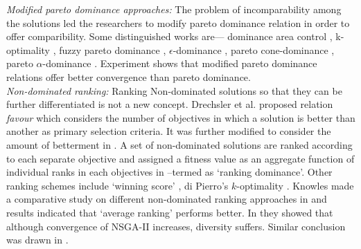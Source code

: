 \documentclass[journal]{IEEEtran}
\begin{document}
\textit{Modified pareto dominance approaches:} The problem of incomparability among the solutions led the researchers to modify pareto dominance relation in order to offer comparibility. Some distinguished works are--- dominance area control \cite{sato2007controlling}, k-optimality \cite{farina2002optimal}, fuzzy pareto dominance \cite{koppen2005fuzzy}, $\epsilon$-dominance \cite{laumanns2002combining}, pareto cone-dominance \cite{batista2011comparison}, pareto $\alpha$-dominance \cite{batista2011comparison}. Experiment shows that modified pareto dominance relations offer better convergence than pareto dominance.\\

\textit{Non-dominated ranking:}
Ranking Non-dominated solutions so that they can be further differentiated is not a new concept. Drechsler et al. \cite{drechsler2001multi} proposed relation \textit{favour} which considers the number of objectives in which a solution is better than another as primary selection criteria. It was further modified to consider the amount of betterment in \cite{sulflow2007robust}. A set of non-dominated solutions are ranked according to each separate objective and assigned a fitness value as an aggregate function of individual ranks in each objectives in \cite{kukkonen2007ranking}--termed as `ranking dominance'. Other ranking schemes include `winning score' \cite{maneeratana2006compressed}, di Pierro's $k$-optimality \cite{di2006many}. Knowles made a comparative study on different non-dominated ranking approaches in \cite{corne2007techniques} and results indicated that `average ranking' performs better. In \cite{ishibuchi2008effectiveness} they showed that although convergence of NSGA-II increases, diversity suffers. Similar conclusion was drawn in \cite{kukkonen2007ranking}.\\
\end{document}
